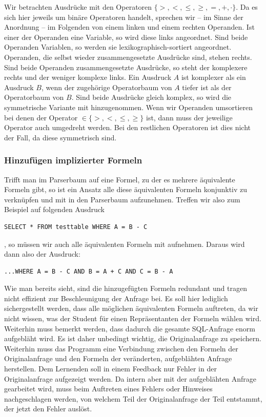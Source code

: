 Wir betrachten Ausdrücke mit den Operatoren $\{>,<,\leq,\geq,=,+,\cdot\}$. Da es sich hier jeweils um binäre Operatoren handelt, sprechen wir -- im Sinne der Anordnung -- im Folgenden von einem linken und einem rechten Operanden. Ist einer der Operanden eine Variable, so wird diese links angeordnet. Sind beide Operanden Variablen, so werden sie lexikographisch-sortiert angeordnet. Operanden, die selbst wieder zusammengesetzte Ausdrücke sind, stehen rechts. Sind beide Operanden zusammengesetzte Ausdrücke, so steht der komplexere rechts und der weniger komplexe links. Ein Ausdruck $A$ ist komplexer als ein Ausdruck $B$, wenn der zugehörige Operatorbaum von $A$ tiefer ist als der Operatorbaum von $B$. Sind beide Ausdrücke gleich komplex, so wird die symmetrische Variante mit hinzugenommen. Wenn wir Operanden umsortieren bei denen der Operator $\in \{>,<,\leq,\geq\}$ ist, dann muss der jeweilige Operator auch umgedreht werden. Bei den restlichen Operatoren ist dies nicht der Fall, da diese symmetrisch sind.

\subsubsection{Hinzufügen implizierter Formeln}

Trifft man im Parserbaum auf eine Formel, zu der es mehrere äquivalente Formeln gibt, so ist ein Ansatz alle diese äquivalenten Formeln konjunktiv zu verknüpfen und mit in den Parserbaum aufzunehmen. Treffen wir also zum Beispiel auf folgenden Ausdruck \begin{verbatim}SELECT * FROM testtable WHERE A = B - C\end{verbatim}, so müssen wir auch alle äquivalenten Formeln mit aufnehmen. Daraus wird dann also der Ausdruck: \begin{verbatim}...WHERE A = B - C AND B = A + C AND C = B - A\end{verbatim}

Wie man bereits sieht, sind die hinzugefügten Formeln redundant und tragen nicht effizient zur Beschleunigung der Anfrage bei. Es soll hier lediglich sichergestellt werden, dass alle möglichen äquivalenten Formeln auftreten, da wir nicht wissen, was der Student für einen Repräsentanten der Formeln wählen wird. Weiterhin muss bemerkt werden, dass dadurch die gesamte SQL-Anfrage enorm aufgebläht wird. Es ist daher unbedingt wichtig, die Originalanfrage zu speichern. Weiterhin muss das Programm eine Verbindung zwischen den Formeln der Originalanfrage und den Formeln der veränderten, aufgeblähten Anfrage herstellen. Dem Lernenden soll in einem Feedback nur Fehler in der Originalanfrage aufgezeigt werden. Da intern aber mit der aufgeblähten Anfrage gearbeitet wird, muss beim Auftreten eines Fehlers oder Hinweises nachgeschlagen werden, von welchem Teil der Originalanfrage der Teil entstammt, der jetzt den Fehler auslöst.

